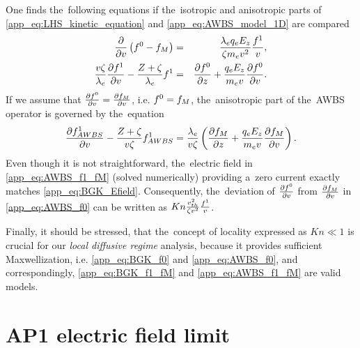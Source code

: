 One finds the~following equations if the~isotropic and anisotropic parts of 
\eqref{app_eq:LHS_kinetic_equation} and \eqref{app_eq:AWBS_model_1D} are 
compared 
\begin{eqnarray}
  \frac{\partial{}}{\partial{v}}\left( f^0 -f_M\right) &=& 
  \frac{\lambda_eq_eE_z}{\zeta m_ev^2}\frac{f^1}{v} ,
  \label{app_eq:AWBS_f0} \\
  \frac{v\zeta}{\lambda_e} \frac{\partial{f^1}}{\partial{v}} 
  - \frac{Z+\zeta}{\lambda_e}f^1 &=&
  \frac{\partial{f^0}}{\partial{z}} + \frac{q_eE_z}{m_ev}\frac{\partial{f^0}}{\partial{v}} .
  \label{app_eq:AWBS_f1} 
\end{eqnarray}
If we assume that $\frac{\partial{f^0}}{\partial{v}} = \frac{\partial{f_M}}{\partial{v}}$, i.e. $f^0 = f_M$,
the~anisotropic part of the~AWBS operator is governed by the~equation
\begin{equation}
  \frac{\partial{f^1_{AWBS}}}{\partial{v}} 
  - \frac{Z+\zeta}{v\zeta}f^1_{AWBS} =
  \frac{\lambda_e}{v\zeta} 
  \left(\frac{\partial{f_M}}{\partial{z}} + \frac{q_eE_z}{m_ev}\frac{\partial{f_M}}{\partial{v}}\right) .
  \label{app_eq:AWBS_f1_fM}
\end{equation}
Even though it is not straightforward, the~electric field in 
\eqref{app_eq:AWBS_f1_fM} (solved numerically) providing a~zero current 
exactly matches \eqref{app_eq:BGK_Efield}. Consequently, the~deviation of
$\frac{\partial{f^0}}{\partial{v}}$ from $\frac{\partial{f_M}}{\partial{v}}$ in 
\eqref{app_eq:AWBS_f0} can be written as 
$Kn\frac{v_{th}^2}{\zeta v^2}\frac{f^1}{v}$.

Finally, it should be stressed, that the~concept of locality expressed as 
$Kn\ll1$ is crucial for our \textit{local diffusive regime} analysis, 
because it provides sufficient Maxwellization, i.e.  \eqref{app_eq:BGK_f0} and
\eqref{app_eq:AWBS_f0}, and correspondingly, \eqref{app_eq:BGK_f1_fM} 
and \eqref{app_eq:AWBS_f1_fM} are valid models.

\section{AP1 electric field limit}
\label{app:AP1limit}


